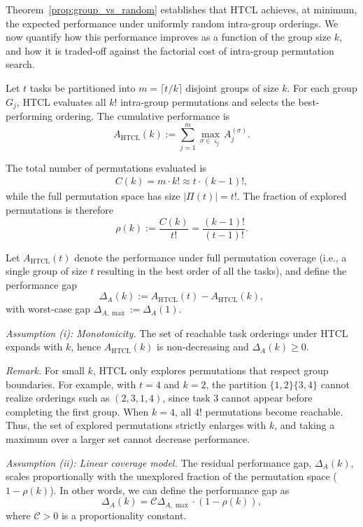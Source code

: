 Theorem~\ref{prop:group_vs_random} establishes that HTCL achieves, at minimum, the expected performance under uniformly random intra-group orderings. We now quantify how this performance improves as a function of the group size $k$, and how it is traded-off against the factorial cost of intra-group permutation search.

Let $t$ tasks be partitioned into $m = \lceil t/k \rceil$ disjoint groups of size $k$. For each group $G_j$, HTCL evaluates all $k!$ intra-group permutations and selects the best-performing ordering. The cumulative performance is
\[
A_{\mathrm{HTCL}}(k) := \sum_{j=1}^{m} \max_{\sigma \in \varsigma_j} A_j^{(\sigma)}.
\]

The total number of permutations evaluated is
\begin{align}\label{eq:complexity}
C(k) = m \cdot k! \approx t \cdot (k-1)!,
\end{align}
while the full permutation space has size $|\Pi(t)| = t!$. The fraction of explored permutations is therefore
\[
\rho(k) := \frac{C(k)}{t!} = \frac{(k-1)!}{(t-1)!}.
\]

Let $A_{\mathrm{HTCL}}(t)$ denote the performance under full permutation coverage (i.e., a single group of size $t$ resulting in the best order of all the tasks), and define the performance gap
\[
\Delta_A(k) := A_{\mathrm{HTCL}}(t) - A_{\mathrm{HTCL}}(k),
\]
with worst-case gap $\Delta_{A,\max} := \Delta_A(1)$.

\emph{Assumption (i): Monotonicity.} The set of reachable task orderings under HTCL expands with $k$, hence $A_{\mathrm{HTCL}}(k)$ is non-decreasing and $\Delta_A(k) \ge 0$.

\emph{Remark.} For small $k$, HTCL only explores permutations that respect group boundaries. For example, with $t=4$ and $k=2$, the partition $\{1,2\}\{3,4\}$ cannot realize orderings such as $(2,3,1,4)$, since task $3$ cannot appear before completing the first group. When $k=4$, all $4!$ permutations become reachable. Thus, the set of explored permutations strictly enlarges with $k$, and taking a maximum over a larger set cannot decrease performance.

\medskip

\emph{Assumption (ii): Linear coverage model.} The residual performance gap, $\Delta_A(k)$, scales proportionally with the unexplored fraction of the permutation space ($1-\rho(k)$). In other words, we can define the performance gap as
\[
\Delta_A(k) = \mathcal{C} \Delta_{A,\max} \cdot (1 - \rho(k)),
\]
where $\mathcal{C}>0$ is a proportionality constant.

